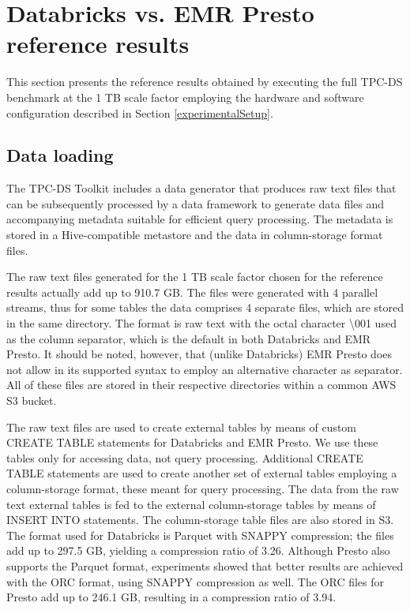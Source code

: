 \section{Databricks vs. EMR Presto reference results}\label{referenceResults}

This section presents the reference results obtained by executing the full TPC-DS benchmark at the 1 TB scale factor employing the hardware and software configuration described in Section \ref{experimentalSetup}.

\subsection{Data loading}\label{referenceResultsDataLoadingSec}

The TPC-DS Toolkit includes a data generator that produces raw text files that can be subsequently processed by a data framework to generate data files and accompanying metadata suitable for efficient query processing. The metadata is stored in a Hive-compatible metastore and the data in column-storage format files.

The raw text files generated for the 1 TB scale factor chosen for the reference results actually add up to 910.7 GB. The files were generated with 4 parallel streams, thus for some tables the data comprises 4 separate files, which are stored in the same directory. The format is raw text with the octal character \textbackslash 001 used as the column separator, which is the default in both Databricks and EMR Presto. It should be noted, however, that (unlike Databricks) EMR Presto does not allow in its supported syntax to employ an alternative character as separator. All of these files are stored in their respective directories within a common AWS S3 bucket.

The raw text files are used to create external tables by means of custom CREATE TABLE statements for Databricks and EMR Presto. We use these tables only for accessing data, not query processing. Additional CREATE TABLE statements are used to create another set of external tables employing a column-storage format, these meant for query processing. The data from the raw text external tables is fed to the external column-storage tables by means of INSERT INTO statements. The column-storage table files are also stored in S3. The format used for Databricks is Parquet with SNAPPY compression; the files add up to 297.5 GB, yielding a compression ratio of 3.26. Although Presto also supports the Parquet format, experiments showed that better results are achieved with the ORC format, using SNAPPY compression as well. The ORC files for Presto add up to 246.1 GB, resulting in a compression ratio of 3.94.

